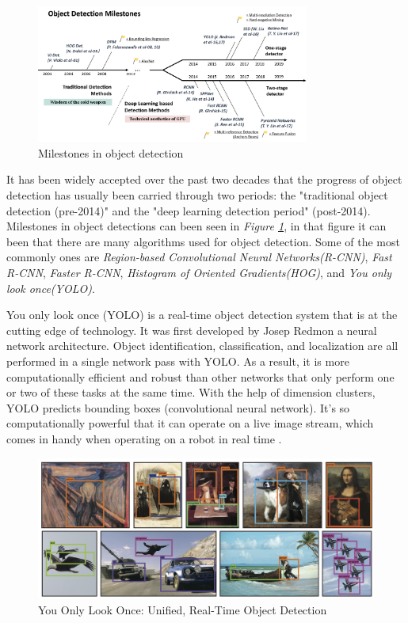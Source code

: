 \begin{figure}[h]
    \centering
    \includegraphics[width=0.8\textwidth]{graphics/objectdetection.png}
    \caption{Milestones in object detection}
    \label{fig:milestones}
\end{figure}
It has been widely accepted over the past two decades that the progress of object detection has usually been carried through two periods: the "traditional object detection (pre-2014)" and the "deep learning detection period" (post-2014). Milestones in object detections can been seen in \textit{Figure \ref{fig:milestones}}, in that figure it can been that there are many algorithms used for object detection. Some of the most commonly ones are \textit{Region-based Convolutional Neural Networks(R-CNN)}, \textit{Fast R-CNN}, \textit{Faster R-CNN}, \textit{Histogram of Oriented Gradients(HOG)}, and \textit{You only look once(YOLO)}.

You only look once (YOLO) is a real-time object detection system that is at the cutting edge of technology. 
It was first developed by Josep Redmon a neural network architecture.
Object identification, classification, and localization are all performed in a single network pass with YOLO. 
As a result, it is more computationally efficient and robust than other networks that only perform one or two of these tasks at the same time. 
With the help of dimension clusters, YOLO predicts bounding boxes (convolutional neural network). 
It's so computationally powerful that it can operate on a live image stream, which comes in handy when operating on a robot in real time \cite{redmon_yolov3_2018}.
\begin{figure} [ht]
    \centering
    \includegraphics[width = 0.9 \textwidth]{graphics/yolo.PNG}
    \caption{You Only Look Once: Unified, Real-Time Object Detection \cite{redmon_you_2016}}
    \label{fig:yolo}
\end{figure}


